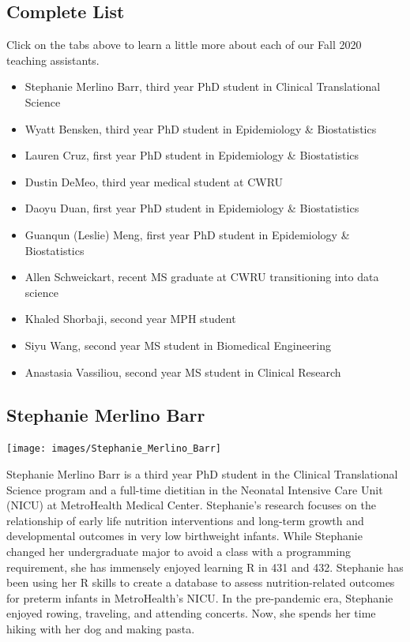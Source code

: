 \documentclass[
]{book}
\providecommand{\tightlist}{%
  \setlength{\itemsep}{0pt}\setlength{\parskip}{0pt}}
\begin{document}
\hypertarget{complete-list}{%
\subsection{Complete List}\label{complete-list}}

Click on the tabs above to learn a little more about each of our Fall 2020 teaching assistants.

\begin{itemize}
\tightlist
\item
  Stephanie Merlino Barr, third year PhD student in Clinical Translational Science
\item
  Wyatt Bensken, third year PhD student in Epidemiology \& Biostatistics
\item
  Lauren Cruz, first year PhD student in Epidemiology \& Biostatistics
\item
  Dustin DeMeo, third year medical student at CWRU
\item
  Daoyu Duan, first year PhD student in Epidemiology \& Biostatistics
\item
  Guanqun (Leslie) Meng, first year PhD student in Epidemiology \& Biostatistics
\item
  Allen Schweickart, recent MS graduate at CWRU transitioning into data science
\item
  Khaled Shorbaji, second year MPH student
\item
  Siyu Wang, second year MS student in Biomedical Engineering
\item
  Anastasia Vassiliou, second year MS student in Clinical Research
\end{itemize}

\hypertarget{stephanie-merlino-barr}{%
\subsection{Stephanie Merlino Barr}\label{stephanie-merlino-barr}}

\texttt{[image: images/Stephanie\_Merlino\_Barr]}

Stephanie Merlino Barr is a third year PhD student in the Clinical Translational Science program and a full-time dietitian in the Neonatal Intensive Care Unit (NICU) at MetroHealth Medical Center. Stephanie's research focuses on the relationship of early life nutrition interventions and long-term growth and developmental outcomes in very low birthweight infants. While Stephanie changed her undergraduate major to avoid a class with a programming requirement, she has immensely enjoyed learning R in 431 and 432. Stephanie has been using her R skills to create a database to assess nutrition-related outcomes for preterm infants in MetroHealth's NICU. In the pre-pandemic era, Stephanie enjoyed rowing, traveling, and attending concerts. Now, she spends her time hiking with her dog and making pasta.
\end{document}
